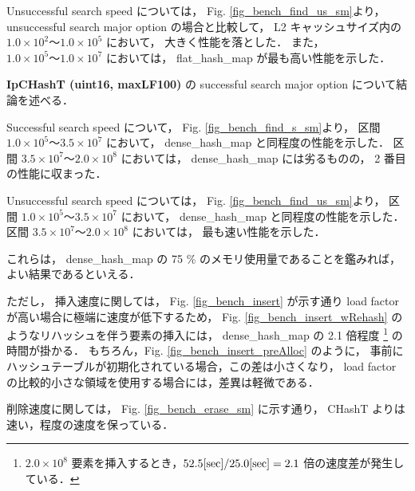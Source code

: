 Unsuccessful search speed については，
Fig. \ref{fig_bench_find_us_sm}より，
unsuccessful search major option の場合と比較して，
L2 キャッシュサイズ内の $1.0\times10^2〜1.0\times10^5$ において，
大きく性能を落とした．
また，$1.0\times10^5〜1.0\times10^7$ においては，
flat\_hash\_map が最も高い性能を示した．
\newline

{\bf IpCHashT (uint16, maxLF100)} の successful search major option について結論を述べる．

Successful search speed について，
Fig. \ref{fig_bench_find_s_sm}より，
区間 $1.0\times10^5〜3.5\times10^7$ において，
dense\_hash\_map と同程度の性能を示した．
区間 $3.5\times10^7〜2.0\times10^8$ においては，
dense\_hash\_map には劣るものの，
2 番目の性能に収まった．

Unsuccessful search speed については，
Fig. \ref{fig_bench_find_us_sm}より，
区間 $1.0\times10^5〜3.5\times10^7$ において，
dense\_hash\_map と同程度の性能を示した．
区間 $3.5\times10^7〜2.0\times10^8$ においては，
最も速い性能を示した．

これらは，
dense\_hash\_map の 75 \% のメモリ使用量であることを鑑みれば，
よい結果であるといえる．

ただし，
挿入速度に関しては，
Fig. \ref{fig_bench_insert} が示す通り load factor が高い場合に極端に速度が低下するため，
Fig. \ref{fig_bench_insert_wRehash} のようなリハッシュを伴う要素の挿入には，
dense\_hash\_map の 2.1 倍程度
\footnote{
  $2.0\times 10^8$ 要素を挿入するとき，$52.5 {\rm[sec]}/ 25.0{\rm[sec]}=2.1$ 倍の速度差が発生している．
}
の時間が掛かる．
もちろん，Fig. \ref{fig_bench_insert_preAlloc} のように，
事前にハッシュテーブルが初期化されている場合，この差は小さくなり，
load factor の比較的小さな領域を使用する場合には，差異は軽微である．

削除速度に関しては，
Fig. \ref{fig_bench_erase_sm} に示す通り，
CHashT よりは速い，程度の速度を保っている．
\newline

